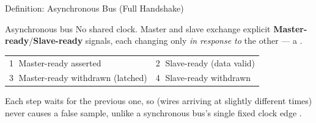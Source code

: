 \documentclass[aspectratio=169]{beamer}
\begin{document}
\begin{frame}{Definition: Asynchronous Bus (Full Handshake)}
  \begin{center}
  \end{center}
  \vspace{-0.2cm}
  \begin{block}{Asynchronous bus}
    No shared clock. Master and slave exchange explicit
    \textbf{Master-ready}/\textbf{Slave-ready} signals, each changing only
    \emph{in response to} the other --- a .
  \end{block}
  \footnotesize
  \begin{tabular}{@{}p{}p{}@{}}
    \textcircled{\scriptsize 1} Master-ready asserted &
    \textcircled{\scriptsize 2} Slave-ready (data valid) \\
    \textcircled{\scriptsize 3} Master-ready withdrawn (latched) &
    \textcircled{\scriptsize 4} Slave-ready withdrawn \\
  \end{tabular}
  \normalsize
  Each step waits for the previous one, so  (wires
  arriving at slightly different times) never causes a false sample, unlike
  a synchronous bus's single fixed clock edge
  \cite{Hamacher2002_computer_organization}.
\end{frame}
\end{document}
